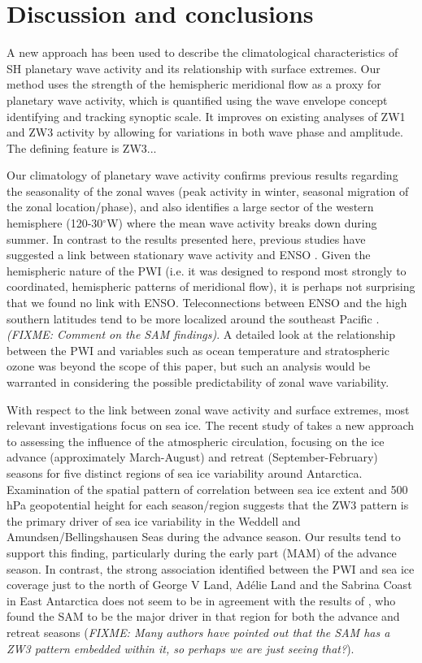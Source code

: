 \section{Discussion and conclusions}

A new approach has been used to describe the climatological characteristics of SH planetary wave activity and its relationship with surface extremes. Our method uses the strength of the hemispheric meridional flow as a proxy for planetary wave activity, which is quantified using the wave envelope concept identifying and tracking synoptic scale. It improves on existing analyses of ZW1 and ZW3 activity by allowing for variations in both wave phase and amplitude. The defining feature is ZW3...

Our climatology of planetary wave activity confirms previous results regarding the seasonality of the zonal waves (peak activity in winter, seasonal migration of the zonal location/phase), and also identifies a large sector of the western hemisphere (120-30$^{\circ}$W) where the mean wave activity breaks down during summer. In contrast to the results presented here, previous studies have suggested a link between stationary wave activity and ENSO \citep[e.g.][]{Trenberth1980,Raphael2003,Hobbs2007}. Given the hemispheric nature of the PWI (i.e. it was designed to respond most strongly to coordinated, hemispheric patterns of meridional flow), it is perhaps not surprising that we found no link with ENSO. Teleconnections between ENSO and the high southern latitudes tend to be more localized around the southeast Pacific \citep{Turner2004}. \textit{(FIXME: Comment on the SAM findings)}. A detailed look at the relationship between the PWI and variables such as ocean temperature and stratospheric ozone was beyond the scope of this paper, but such an analysis would be warranted in considering the possible predictability of zonal wave variability.

With respect to the link between zonal wave activity and surface extremes, most relevant investigations focus on sea ice. The recent study of \citet{Raphael2014} takes a new approach to assessing the influence of the atmospheric circulation, focusing on the ice advance (approximately March-August) and retreat (September-February) seasons for five distinct regions of sea ice variability around Antarctica. Examination of the spatial pattern of correlation between sea ice extent and 500 hPa geopotential height for each season/region suggests that the ZW3 pattern is the primary driver of sea ice variability in the Weddell and Amundsen/Bellingshausen Seas during the advance season. Our results tend to support this finding, particularly during the early part (MAM) of the advance season. In contrast, the strong association identified between the PWI and sea ice coverage just to the north of George V Land, Ad{\'e}lie Land and the Sabrina Coast in East Antarctica does not seem to be in agreement with the results of \citet{Raphael2014}, who found the SAM to be the major driver in that region for both the advance and retreat seasons (\textit{FIXME: Many authors have pointed out that the SAM has a ZW3 pattern embedded within it, so perhaps we are just seeing that?}). 


